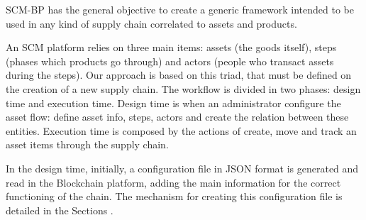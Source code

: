 \label{chap:Technical}

\acresetall 

\ac{SCM-BP} has the general objective to create a generic framework intended to be used in any kind of supply chain correlated to assets and products. 

An SCM platform relies on three main items: assets (the goods itself), steps (phases which products go through) and actors (people who transact assets during the steps). Our approach is based on this triad, that must be defined on the creation of a new supply chain. The workflow is divided in two phases: design time and execution time. Design time is when an administrator configure the asset flow: define asset info, steps, actors and create the relation between these entities. Execution time is composed by the actions of create, move and track an asset items through the supply chain. 

In the design time, initially, a configuration file in JSON format is generated and read in the Blockchain platform, adding the main information for the correct functioning of the chain. The mechanism for creating this configuration file is detailed in the Sections .





%

%
%